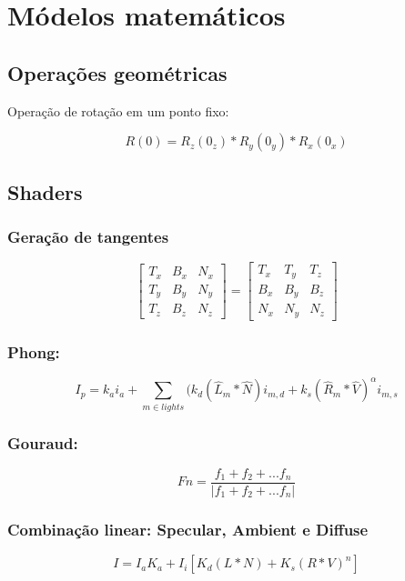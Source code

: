 \section{Módelos matemáticos}

\subsection{Operações geométricas}

Operação de rotação em um ponto fixo:

\[ 
    R(0) = R_z(0_z)*R_y(0_y)*R_x(0_x)
\]

\subsection{Shaders}

\subsubsection{Geração de tangentes}

\[
\begin{bmatrix}
    T_{x} & B_{x} & N_{x} \\
    T_{y} & B_{y} & N_{y} \\
    T_{z}       & B_{z} & N_{z} 
\end{bmatrix}
=
\begin{bmatrix}
    T_{x} & T_{y} & T_{z} \\
    B_{x} & B_{y} & B_{z} \\
    N_{x} & N_{y} & N_{z} 
\end{bmatrix}
\]

\subsubsection{Phong:}

\[ 
    I_p = k_a i_a + \sum_{m \in lights} (k_d(\hat{L}_m * \hat{N}) i_{m,d} + k_s(\hat{R}_m * \hat{V})^{\alpha} i_{m,s}
\] 

\subsubsection{Gouraud:}
\[ 
    Fn = \frac{f_1 + f_2 + ... f_n}{|f_1 + f_2 + ... f_n|}
\] 

\subsubsection{Combinação linear: Specular, Ambient e Diffuse}

\[
I = I_a K_a + I_i [K_d(L*N) + K_s (R*V)^n ]
\]